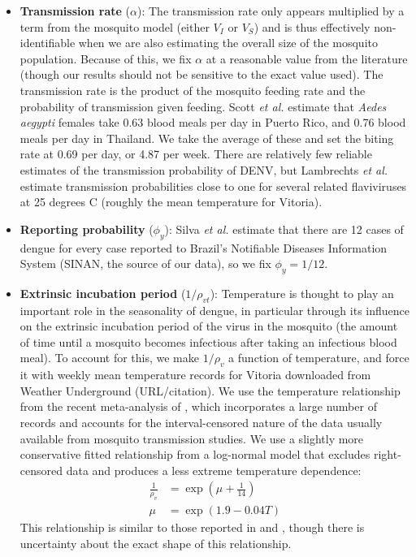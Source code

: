 \documentclass[10pt,letterpaper]{article}
\begin{document}
\begin{itemize}
\item \textbf{Transmission rate} ($\alpha$): The transmission rate only appears multiplied by a term from the mosquito model (either $V_I$ or $V_S$) and is thus effectively non-identifiable when we are also estimating the overall size of the mosquito population.
Because of this, we fix $\alpha$ at a reasonable value from the literature (though our results should not be sensitive to the exact value used).
The transmission rate is the product of the mosquito feeding rate and the probability of transmission given feeding.
Scott \textit{et al.} \cite{Scott2000} estimate that \textit{Aedes aegypti} females take 0.63 blood meals per day in Puerto Rico, and 0.76 blood meals per day in Thailand.
We take the average of these and set the biting rate at 0.69 per day, or 4.87 per week.
There are relatively few reliable estimates of the transmission probability of DENV, but Lambrechts \textit{et al.} \cite{Lambrechts2011} estimate transmission probabilities close to one  for several related flaviviruses at 25 degrees C (roughly the mean temperature for Vitoria).
\\
\item \textbf{Reporting probability} ($\phi_y$): Silva \textit{et al.} \cite{Silva2016} estimate that there are 12 cases of dengue for every case reported to Brazil's Notifiable Diseases Information System (SINAN, the source of our data), so we fix $\phi_y = 1/12$.
\\
\item \textbf{Extrinsic incubation period} ($1/\rho_{vt}$): Temperature is thought to play an important role in the seasonality of dengue, in particular through its influence on the extrinsic incubation period of the virus in the mosquito  (the amount of time until a mosquito becomes infectious after taking an infectious blood meal).
To account for this, we make $1/\rho_v$ a function of temperature, and force it with weekly mean temperature records for Vitoria downloaded from Weather Underground (URL/citation).
We use the temperature relationship from the recent meta-analysis of \cite{Chan2012}, which incorporates a large number of records and accounts for the interval-censored nature of the data usually available from mosquito transmission studies.
We use a slightly more conservative fitted relationship from a log-normal model that excludes right-censored data and produces a less extreme temperature dependence:
\begin{align}
\frac{1}{\rho_v} &= \exp \left(\mu + \frac{1}{14}\right)\\
\mu & = \exp(1.9 - 0.04 T)
\end{align}
This relationship is similar to those reported in \cite{Focks1995} and \cite{Tjaden2013}, though there is uncertainty about the exact shape of this relationship.
\end{itemize}
\end{document}

